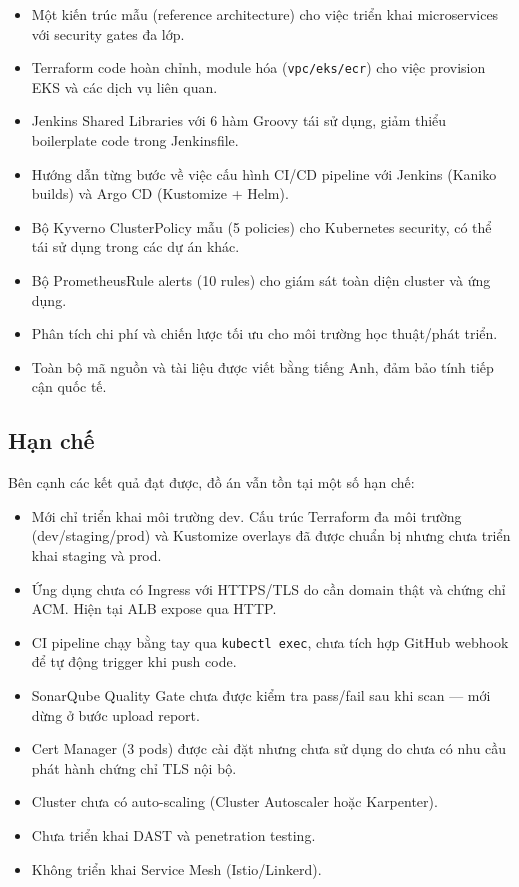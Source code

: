 \documentclass[13pt,a4paper,twoside]{extarticle}
\begin{document}
\begin{itemize}[leftmargin=*,nosep]
  \item Một kiến trúc mẫu (reference architecture) cho việc triển khai microservices với security gates đa lớp.
  \item Terraform code hoàn chỉnh, module hóa (\texttt{vpc/eks/ecr}) cho việc provision EKS và các dịch vụ liên quan.
  \item Jenkins Shared Libraries với 6 hàm Groovy tái sử dụng, giảm thiểu boilerplate code trong Jenkinsfile.
  \item Hướng dẫn từng bước về việc cấu hình CI/CD pipeline với Jenkins (Kaniko builds) và Argo CD (Kustomize + Helm).
  \item Bộ Kyverno ClusterPolicy mẫu (5 policies) cho Kubernetes security, có thể tái sử dụng trong các dự án khác.
  \item Bộ PrometheusRule alerts (10 rules) cho giám sát toàn diện cluster và ứng dụng.
  \item Phân tích chi phí và chiến lược tối ưu cho môi trường học thuật/phát triển.
  \item Toàn bộ mã nguồn và tài liệu được viết bằng tiếng Anh, đảm bảo tính tiếp cận quốc tế.
\end{itemize}

\subsection{Hạn chế}

Bên cạnh các kết quả đạt được, đồ án vẫn tồn tại một số hạn chế:

\begin{itemize}[leftmargin=*,nosep]
  \item Mới chỉ triển khai môi trường dev. Cấu trúc Terraform đa môi trường (dev/staging/prod) và Kustomize overlays đã được chuẩn bị nhưng chưa triển khai staging và prod.
  \item Ứng dụng chưa có Ingress với HTTPS/TLS do cần domain thật và chứng chỉ ACM. Hiện tại ALB expose qua HTTP.
  \item CI pipeline chạy bằng tay qua \texttt{kubectl exec}, chưa tích hợp GitHub webhook để tự động trigger khi push code.
  \item SonarQube Quality Gate chưa được kiểm tra pass/fail sau khi scan --- mới dừng ở bước upload report.
  \item Cert Manager (3 pods) được cài đặt nhưng chưa sử dụng do chưa có nhu cầu phát hành chứng chỉ TLS nội bộ.
  \item Cluster chưa có auto-scaling (Cluster Autoscaler hoặc Karpenter).
  \item Chưa triển khai DAST và penetration testing.
  \item Không triển khai Service Mesh (Istio/Linkerd).
\end{itemize}
\end{document}
